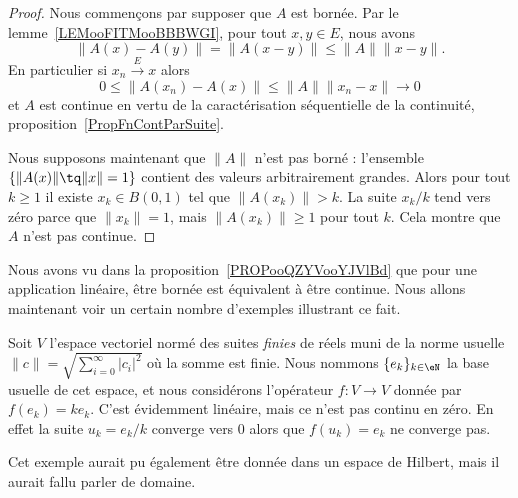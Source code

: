 \begin{proof}
	Nous commençons par supposer que \( A\) est bornée. Par le lemme~\ref{LEMooFITMooBBBWGI}, pour tout \( x,y\in E\), nous avons
	\begin{equation}
		\| A(x)-A(y) \|=\| A(x-y) \|\leq \| A \|\| x-y \|.
	\end{equation}
	En particulier si \( x_n\stackrel{E}{\longrightarrow}x\) alors
	\begin{equation}
		0\leq \| A(x_n)-A(x) \|\leq \| A \|\| x_n-x \|\to 0
	\end{equation}
	et \( A\) est continue en vertu de la caractérisation séquentielle de la continuité, proposition~\ref{PropFnContParSuite}.

	Nous supposons maintenant que \( \| A \|\) n'est pas borné : l'ensemble \( \{ \| A(x) \|\tq \| x \|=1 \}\) contient des valeurs arbitrairement grandes. Alors pour tout \( k\geq 1\) il existe \( x_k\in B(0,1)\) tel que \( \| A(x_k) \|>k\). La suite \( x_k/k\) tend vers zéro parce que \( \| x_k \|=1\), mais \( \| A(x_k) \|\geq 1\) pour tout \( k\). Cela montre que \( A\) n'est pas continue.
\end{proof}


Nous avons vu dans la proposition~\ref{PROPooQZYVooYJVlBd} que pour une application linéaire, être bornée est équivalent à être continue. Nous allons maintenant voir un certain nombre d'exemples illustrant ce fait.

\begin{example}  \label{ExHKsIelG}
	Soit \( V\) l'espace vectoriel normé des suites \emph{finies} de réels muni de la norme usuelle \( \| c \|=\sqrt{\sum_{i=0}^{\infty}| c_i |^2}\) où la somme est finie. Nous nommons \( \{ e_k \}_{k\in \eN}\) la base usuelle de cet espace, et nous considérons l'opérateur \( f\colon V\to V\) donnée par \( f(e_k)=ke_k\). C'est évidemment linéaire, mais ce n'est pas continu en zéro. En effet la suite \( u_k=e_k/k\) converge vers \( 0\) alors que \( f(u_k)=e_k\) ne converge pas.
\end{example}

Cet exemple aurait pu également être donnée dans un espace de Hilbert, mais il aurait fallu parler de domaine.

